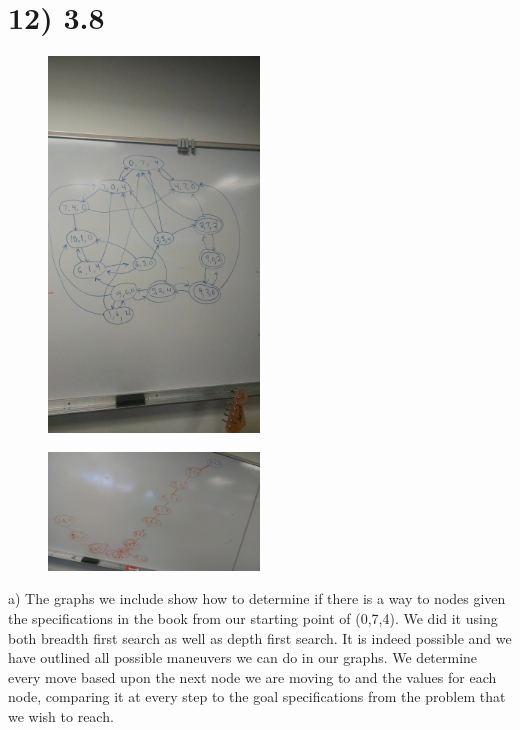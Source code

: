 \documentclass[a4paper]{article}
\begin{document}
\section*{12) 3.8}

\begin{figure}[H]
\centering
\includegraphics[width=0.5\textwidth]{graph.jpg}
\end{figure}

\begin{figure}[H]
\centering
\includegraphics[width=0.5\textwidth]{spanningtree.jpg}
\end{figure}

a) The graphs we include show how to determine if there is a way to nodes given the specifications in the book from our starting point of (0,7,4). We did it using both breadth first search as well as depth first search. It is indeed possible and we have outlined all possible maneuvers we can do in our graphs. We determine every move based upon the next node we are moving to and the values for each node, comparing it at every step to the goal specifications from the problem that we wish to reach.
\end{document}
